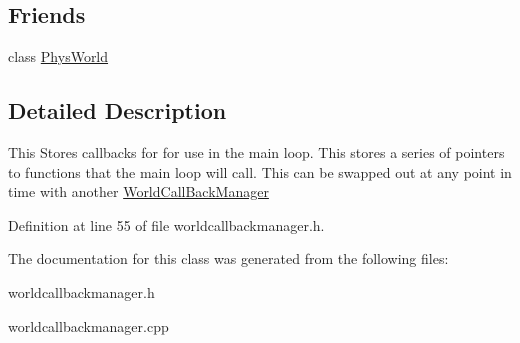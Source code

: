 \subsection*{Friends}
\begin{DoxyCompactItemize}
\item 
\hypertarget{classphys_1_1WorldCallBackManager_a375fd37c70c941f0442997a60fdb05c7}{
class \hyperlink{classphys_1_1WorldCallBackManager_a375fd37c70c941f0442997a60fdb05c7}{PhysWorld}}
\label{d8/d67/classphys_1_1WorldCallBackManager_a375fd37c70c941f0442997a60fdb05c7}

\end{DoxyCompactItemize}


\subsection{Detailed Description}
This Stores callbacks for for use in the main loop. This stores a series of pointers to functions that the main loop will call. This can be swapped out at any point in time with another \hyperlink{classphys_1_1WorldCallBackManager}{WorldCallBackManager} 

Definition at line 55 of file worldcallbackmanager.h.



The documentation for this class was generated from the following files:\begin{DoxyCompactItemize}
\item 
worldcallbackmanager.h\item 
worldcallbackmanager.cpp\end{DoxyCompactItemize}
